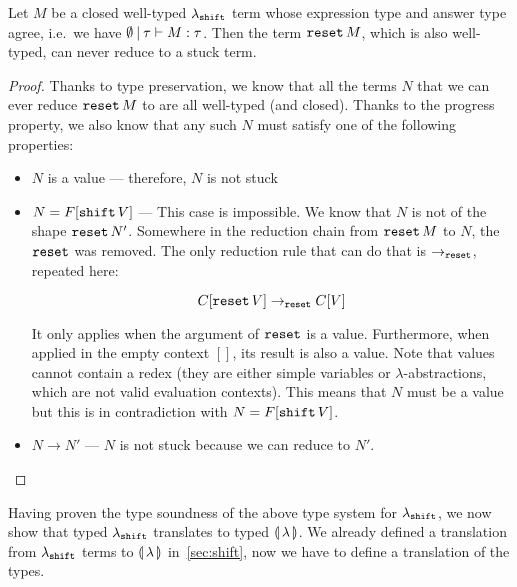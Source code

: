 \begin{property}

  Let $M$ be a closed well-typed $\lambda_{\mathtt{shift}}$ term whose expression
  type and answer type agree, i.e.\ we have $\emptyset \mathbin{|} \tau \vdash M
  : \tau$. Then the term $\mathtt{reset}\,M$, which is also well-typed, can
  never reduce to a stuck term.
\end{property}
\begin{proof}
  Thanks to type preservation, we know that all the terms $N$ that we can
  ever reduce $\mathtt{reset}\,M$ to are all well-typed (and closed). Thanks
  to the progress property, we also know that any such $N$ must satisfy one
  of the following properties:
  \begin{itemize}
  \item $N$ is a value --- therefore, $N$ is not stuck
  \item $N = F[\mathtt{shift}\,V]$ --- This case is impossible. We know that
    $N$ is not of the shape $\mathtt{reset}\,N'$. Somewhere in the reduction
    chain from $\mathtt{reset}\,M$ to $N$, the $\mathtt{reset}$ was removed. The only
    reduction rule that can do that is $\to_{\mathtt{reset}}$, repeated here:

    $$
    C[\mathtt{reset}\,V] \to_{\mathtt{reset}} C[V]
    $$

    It only applies when the argument of $\mathtt{reset}$ is a value. Furthermore,
    when applied in the empty context $[]$, its result is also a
    value. Note that values cannot contain a redex (they are either simple
    variables or $\lambda$-abstractions, which are not valid evaluation
    contexts). This means that $N$ must be a value but this is in
    contradiction with $N = F[\mathtt{shift}\,V]$.
  \item $N \to N'$ --- $N$ is not stuck because we can reduce to $N'$.
  \end{itemize}
\end{proof}

Having proven the type soundness of the above type system for
$\lambda_{\mathtt{shift}}$, we now show that typed $\lambda_{\mathtt{shift}}$ translates to
typed $\llparenthesis \, \lambda \, \rrparenthesis$. We already defined a translation from
$\lambda_{\mathtt{shift}}$ terms to $\llparenthesis \, \lambda \, \rrparenthesis$ in~\ref{sec:shift}, now we
have to define a translation of the types.

